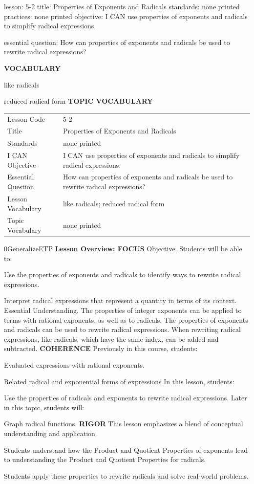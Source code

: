 \documentclass{article}
\newenvironment{lesson-meta}{}{}        %
\newenvironment{te-addendum}[2]{}{}     %
\newcommand{\te}[1]{}                   %
\begin{document}
\begin{lesson-meta}
lesson: 5-2
title: Properties of Exponents and Radicals
standards: none printed
practices: none printed
objective: I CAN use properties of exponents and radicals to simplify radical expressions.

essential question: How can properties of exponents and radicals be used to rewrite radical expressions?

\textbf{VOCABULARY}
\item like radicals
\item reduced radical form
\textbf{TOPIC VOCABULARY}
\te{No topic vocabulary list is printed on these lesson pages.}
\begin{tabular}{ll}
Lesson Code & 5-2 \\
Title & Properties of Exponents and Radicals \\
Standards & none printed \\
I CAN Objective & I CAN use properties of exponents and radicals to simplify radical expressions. \\
Essential Question & How can properties of exponents and radicals be used to rewrite radical expressions? \\
Lesson Vocabulary & like radicals; reduced radical form \\
Topic Vocabulary & none printed \\
\end{tabular}
\end{lesson-meta}
\begin{te-addendum}{0}{GeneralizeETP}
\textbf{Lesson Overview: FOCUS}
Objective. Students will be able to:
\item Use the properties of exponents and radicals to identify ways to rewrite radical expressions.
\item Interpret radical expressions that represent a quantity in terms of its context.
Essential Understanding. The properties of integer exponents can be applied to terms with rational exponents, as well as to radicals. The properties of exponents and radicals can be used to rewrite radical expressions. When rewriting radical expressions, like radicals, which have the same index, can be added and subtracted.
\textbf{COHERENCE}
Previously in this course, students:
\item Evaluated expressions with rational exponents.
\item Related radical and exponential forms of expressions
In this lesson, students:
\item Use the properties of radicals and exponents to rewrite radical expressions.
Later in this topic, students will:
\item Graph radical functions.
\textbf{RIGOR}
This lesson emphasizes a blend of conceptual understanding and application.
\item Students understand how the Product and Quotient Properties of exponents lead to understanding the Product and Quotient Properties for radicals.
\item Students apply these properties to rewrite radicals and solve real-world problems.
\end{te-addendum}
\end{document}
